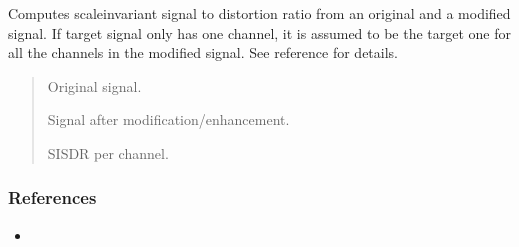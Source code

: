 \documentclass[letterpaper,10pt,english]{sphinxmanual}
\begin{document}
\begin{fulllineitems}
\label{\detokenize{modules/dsptoolbox.distances:dsptoolbox.distances.si_sdr}}
\pysigstartsignatures
{}
\pysigstopsignatures
\sphinxAtStartPar
Computes scale\sphinxhyphen{}invariant signal to distortion ratio from an original
and a modified signal. If target signal only has one channel, it is
assumed to be the target one for all the channels in the modified signal.
See reference for details.
\begin{quote}\begin{description}
\begin{description}
\sphinxlineitem{\sphinxstylestrong{tartget\_signal}}{[}\sphinxtitleref{Signal}{]}
\sphinxAtStartPar
Original signal.

\sphinxlineitem{\sphinxstylestrong{modified\_signal}}{[}\sphinxtitleref{Signal}{]}
\sphinxAtStartPar
Signal after modification/enhancement.

\end{description}

\begin{description}
\sphinxlineitem{\sphinxstylestrong{sdr}}{[}\sphinxtitleref{np.ndarray}{]}
\sphinxAtStartPar
SI\sphinxhyphen{}SDR per channel.

\end{description}

\end{description}\end{quote}
\subsubsection*{References}
\begin{itemize}
\item {} 
\sphinxAtStartPar
{}

\end{itemize}

\end{fulllineitems}
\end{document}
